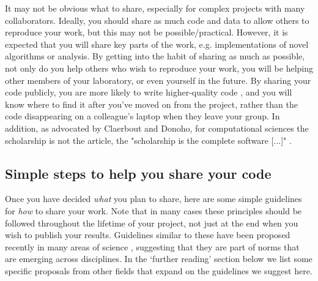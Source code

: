 \documentclass[11pt]{article}
\begin{document}
It may not be obvious what to share, especially for complex projects with many collaborators.  Ideally,
you should share as much code and data to allow others to reproduce
your work,  but this may not be possible/practical.  However, it
is expected that you will share key parts of the work, e.g. implementations of novel algorithms or analysis.  By getting into the habit of sharing as much as possible, not only do you help others who wish to reproduce your work, you will be helping other members of your laboratory, or even yourself in the future.  By sharing your code publicly, you are more likely to write higher-quality code \cite{Easterbrook2014}, and you will know where to find it after you've moved on from the project, rather than the code disappearing on a colleague's laptop when they leave your group. In addition, as advocated by Claerbout and Donoho, for computational sciences the scholarship is not the article, the "scholarship is the complete software [...]" \cite{claerbout_electronic_1992, donoho_invitation_2010}.

\subsection*{Simple steps to help you share your code}

Once you have decided \textit{what} you plan to share, here are some simple 
guidelines for \textit{how} to share your work.  Note that in many cases these
principles should be followed throughout the lifetime of your project,
not just at the end when you wish to publish your results. Guidelines similar to these have been proposed recently in many areas of science \cite{Nosek2015, miguel2014, stodden2012journals}, suggesting that they are part of norms that are emerging across disciplines. In the `further reading' section below we list some specific proposals from other fields that expand on the guidelines we suggest here.  
\end{document}
